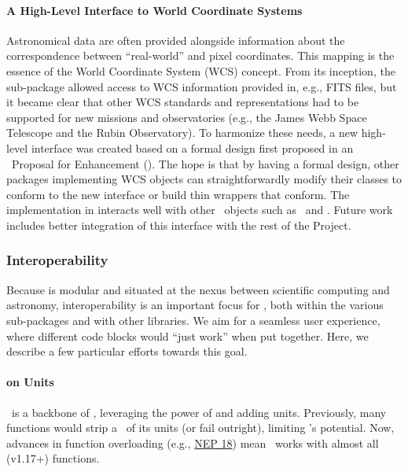 \documentclass[modern]{aastex631}
\begin{document}
\paragraph{A High-Level Interface to World Coordinate Systems}
Astronomical data are often provided alongside information about the
correspondence between ``real-world'' and pixel coordinates. This mapping is the
essence of the World Coordinate System (WCS) concept. From its inception,
the  sub-package allowed access to WCS information provided
in, e.g., FITS files, but it became clear that other WCS standards and
representations had to be supported for new missions and observatories (e.g.,
the James Webb Space Telescope and the Rubin Observatory). To harmonize these
needs, a new high-level interface was created based on a formal design first
proposed in an \astropy\ Proposal for Enhancement (). The hope is
that by having a formal design, other packages implementing WCS objects can
straightforwardly modify their classes to conform to the new interface or build
thin wrappers that conform. The implementation in  interacts
well with other \astropypkg\ objects such as \astropySkyCoord\ and \astropyTime.
Future work includes better integration of this interface with the rest of
the Project.

\subsubsection{Interoperability} \label{sec:core-features-interoperability}

Because \astropy is modular and situated at the nexus between scientific
computing and astronomy, interoperability is an important focus for \astropy,
both within the various \astropypkg sub-packages and with other \python
libraries. We aim for a seamless user experience, where different code blocks
would ``just work'' when put together. Here, we describe a few particular
efforts towards this goal.

\paragraph{ on Units}

\astropyQuantity\ is a backbone of \astropy, leveraging the power of
 and adding units. Previously, many  functions
would strip a \astropyQuantity\ of its units (or fail outright), limiting
\astropyQuantity's potential. Now, advances in  function
overloading (e.g.,
\href{https://numpy.org/neps/nep-0018-array-function-protocol.html}{NEP 18})
mean \astropyQuantity\ works with almost all  (v1.17+)
functions.
\end{document}
